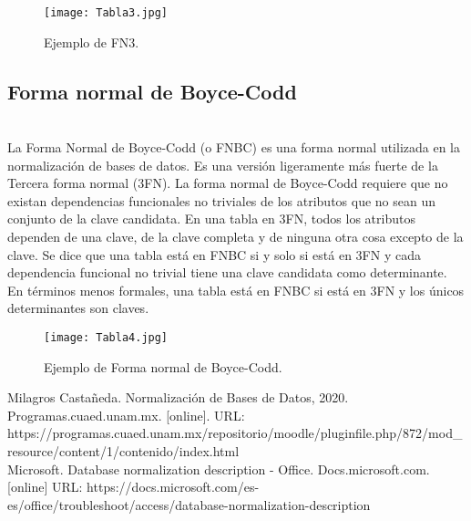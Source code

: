 \documentclass[spanish]{article}
\begin{document}
    \begin{figure}[h]
        \centering
        \texttt{[image: Tabla3.jpg]}
        \caption{Ejemplo de FN3.}
        \label{fig:comu}
    \end{figure}

\subsection{Forma normal de Boyce-Codd}\\
La Forma Normal de Boyce-Codd (o FNBC) es una forma normal utilizada en la normalización de bases de datos. Es una versión ligeramente más fuerte de la Tercera forma normal (3FN). La forma normal de Boyce-Codd requiere que no existan dependencias funcionales no triviales de los atributos que no sean un conjunto de la clave candidata. En una tabla en 3FN, todos los atributos dependen de una clave, de la clave completa y de ninguna otra cosa excepto de la clave. Se dice que una tabla está en FNBC si y solo si está en 3FN y cada dependencia funcional no trivial tiene una clave candidata como determinante. En términos menos formales, una tabla está en FNBC si está en 3FN y los únicos determinantes son claves.
\begin{figure}[h]
        \centering
        \texttt{[image: Tabla4.jpg]}
        \caption{Ejemplo de Forma normal de Boyce-Codd.}
        \label{fig:comu}
    \end{figure}

\newpage

\begin{thebibliography}{XXX0000}
   Milagros Castañeda. Normalización de Bases de Datos, 2020. Programas.cuaed.unam.mx. [online]. URL: https://programas.cuaed.unam.mx/repositorio/moodle/pluginfile.php/872/mod_resource/content/1/contenido/index.html\\
  
   Microsoft. Database normalization description - Office. Docs.microsoft.com.[online] URL:	https://docs.microsoft.com/es-es/office/troubleshoot/access/database-normalization-description
\end{thebibliography}
\end{document}
